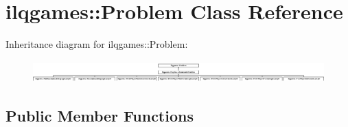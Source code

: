 \hypertarget{classilqgames_1_1_problem}{}\section{ilqgames\+:\+:Problem Class Reference}
\label{classilqgames_1_1_problem}
Inheritance diagram for ilqgames\+:\+:Problem\+:\begin{figure}[H]
\begin{center}
\leavevmode
\includegraphics[height=0.866426cm]{classilqgames_1_1_problem}
\end{center}
\end{figure}
\subsection*{Public Member Functions}
